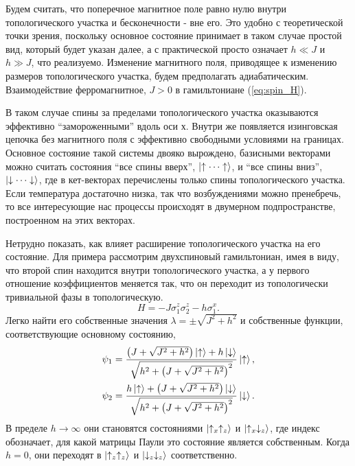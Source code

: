 \documentclass[a4paper,12pt]{article}
\theoremstyle{plain} %
\theoremstyle{definition} %
\theoremstyle{remark} %
\begin{document}
Будем считать, что поперечное магнитное поле равно нулю внутри топологического участка и бесконечности - вне его. Это удобно с теоретической точки зрения, поскольку основное состояние принимает в таком случае простой вид, который будет указан далее, а с практической просто означает $h \ll J$ и $h \gg J$, что реализуемо. Изменение магнитного поля, приводящее к изменению размеров топологического участка, будем предполагать адиабатическим. Взаимодействие ферромагнитное, $J>0$ в гамильтониане (\ref{eq:spin_H}).

В таком случае спины за пределами топологического участка оказываются эффективно ``замороженными'' вдоль оси $х$. Внутри же появляется изинговская цепочка без магнитного поля с эффективно свободными условиями на границах. Основное состояние такой системы двояко вырождено, базисными векторами можно считать состояния ``все спины вверх'', $\ket{\uparrow \dotsm \uparrow}$, и ``все спины вниз'', $\ket{\downarrow \dotsm \downarrow}$, где в кет-векторах перечислены только спины топологического участка. Если температура достаточно низка, так что возбуждениями можно пренебречь, то все интересующие нас процессы происходят в двумерном подпространстве, построенном на этих векторах. 

Нетрудно показать, как влияет расширение топологического участка на его состояние. Для примера рассмотрим двухспиновый гамильтониан, имея в виду, что второй спин находится внутри топологического участка, а у первого отношение коэффициентов меняется так, что он переходит из топологически тривиальной фазы в топологическую.
\begin{equation}
    H = -J \sigma_1^z \sigma_2^z - h \sigma_1^x.
    \label{eq:32_model_H}
\end{equation}
Легко найти его собственные значения $\lambda = \pm \sqrt{J^2 + h^2}$ и собственные функции, соответствующие основному состоянию,
\begin{gather*}
    \psi_1 = \frac{\left( J + \sqrt{J^2 + h^2} \right) \ket{\uparrow} + h \ket{\downarrow}}{\sqrt{h^2 + \left(J + \sqrt{J^2 + h^2} \right)^2}} \ket{\uparrow}, \\
    \psi_2 = \frac{ h \ket{\uparrow} + \left( J + \sqrt{J^2 + h^2} \right) \ket{\downarrow}}{\sqrt{h^2 + \left(J + \sqrt{J^2 + h^2} \right)^2}} \ket{\downarrow}.
\end{gather*}
В пределе $h \rightarrow \infty$ они становятся состояниями $\ket{\uparrow_x \uparrow_z}$ и $\ket{\uparrow_x \downarrow_z}$, где индекс обозначает, для какой матрицы Паули это состояние является собственным. Когда $h = 0$, они переходят в $\ket{\uparrow_z \uparrow_z}$ и $\ket{\downarrow_z \downarrow_z}$ соответственно.
\end{document}
